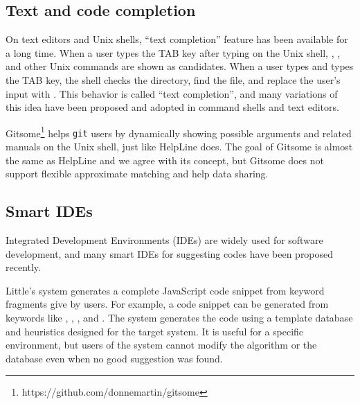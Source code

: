 \documentclass[manuscript,anonymous,review]{acmart}
\def\HL{\textsf{HelpLine}}
\def\GIT{\texttt{git}}
\begin{document}
\subsection{Text and code completion}

On text editors and Unix shells,
``text completion'' feature has been available for a long time.
%
When a user types the TAB key after typing  on the Unix shell,
, , and other Unix commands are shown as candidates.
When a user types  and types the TAB key,
the shell checks the directory, find the  file, and
replace the user's input with .
This behavior is called ``text completion'', and many variations of
this idea have been proposed and adopted in command shells and text editors.


Gitsome\footnote{\textsf{https:{\slash}{\slash}github.com{\slash}donnemartin{\slash}gitsome}}
helps {\GIT} users by
dynamically showing possible arguments and related manuals on the Unix shell,
just like {\HL} does.
The goal of Gitsome is almost the same as {\HL} and we agree with its concept,
but Gitsome does not support flexible approximate matching and
help data sharing.

\subsection{Smart IDEs}

Integrated Development Environments (IDEs) are widely used for
software development, and
many smart IDEs for suggesting codes have been proposed recently.

Little's system\cite{Little:2006:TKC:1166253.1166275}
generates a complete JavaScript code snippet from keyword fragments
give by users.
For example, a code snippet
can be generated from keywords like
,
,
,
and .
The system generates the code using a template database and heuristics
designed for the target system.
It is useful for a specific environment, but
users of the system cannot modify the algorithm or the database
even when no good suggestion was found.

\end{document}

